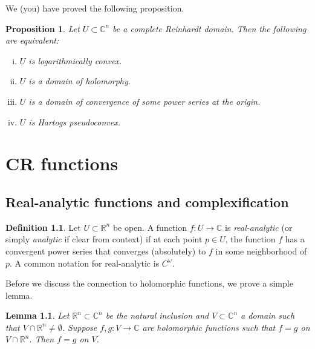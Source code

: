 \documentclass[12pt,openany]{book}
\newcommand{\C}{{\mathbb{C}}}
\newcommand{\R}{{\mathbb{R}}}
\newcommand{\myindex}[1]{#1\index{#1}}
\theoremstyle{plain}
\newtheorem{lemma}[thm]{Lemma}
\newtheorem{prop}[thm]{Proposition}
\theoremstyle{remark}
\theoremstyle{definition}
\newtheorem{defn}[thm]{Definition}
\theoremstyle{exercise}
\theoremstyle{example}
\begin{document}
\pagebreak[2]
We (you) have proved the following proposition.

\begin{prop}
\pagebreak[2]
Let $U \subset \C^n$ be a complete Reinhardt domain.  Then the following are
equivalent:
\begin{enumerate}[(i)]
\item
$U$ is logarithmically convex.
\item
$U$ is a domain of holomorphy.
\item
$U$ is a domain of convergence of some power series at the origin.
\item
$U$ is Hartogs pseudoconvex.
\end{enumerate}
\end{prop}


\chapter{CR functions} \label{ch:crfunctions}


\section{Real-analytic functions and complexification}

\begin{defn}
Let $U \subset \R^n$ be open.
A function $f \colon U \to \C$ is 
\emph{\myindex{real-analytic}} (or simply \emph{analytic} if
clear from context) if at each point $p \in U$, the function $f$
has a convergent power series that converges (absolutely) to $f$ in some
neighborhood of $p$.
%
A common notation for real-analytic is $C^\omega$.
\end{defn}

Before we discuss the connection to holomorphic functions, we prove a simple
lemma.

\begin{lemma}
Let $\R^n \subset \C^n$ be the natural inclusion and 
$V \subset \C^n$ a domain such that $V \cap \R^n \not= \emptyset$.
Suppose $f,g \colon V \to \C$ are holomorphic functions such that
$f=g$ on $V \cap \R^n$.  Then $f=g$ on $V$.
\end{lemma}
\end{document}

